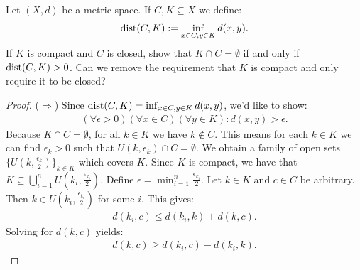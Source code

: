 \documentclass[11pt,twoside,openany]{memoir}
\begin{document}
    \begin{exercise}
        Let $(X,d)$ be a metric space. If $C,K \subseteq X$ we define:
            \begin{equation*}
            \begin{split}
                \operatorname{dist}(C,K):= \inf_{x \in C, y \in K}d(x,y).
            \end{split}
            \end{equation*}
        If $K$ is compact and $C$ is closed, show that $K \cap C = \emptyset$ if and only if $\operatorname{dist}(C,K) > 0$. Can we remove the requirement that $K$ is compact and only require it to be closed?
                \begin{proof}
                    ($\Rightarrow$) Since $\operatorname{dist}(C,K) = \inf_{x \in C,y \in K}d(x,y)$, we'd like to show:
                        \begin{equation*}
                        \begin{split}
                            (\forall \epsilon > 0)(\forall x \in C)(\forall y \in K): d(x,y) > \epsilon.
                        \end{split}
                        \end{equation*}
                    Because $K \cap C = \emptyset$, for all $k \in K$ we have $k \not\in C$. This means for each $k \in K$ we can find $\epsilon_k > 0$ such that $U(k,\epsilon_k) \cap C = \emptyset$. We obtain a family of open sets $\{U(k,\frac{\epsilon_k}{2})\}_{k \in K}$ which covers $K$. Since $K$ is compact, we have that $K \subseteq \bigcup_{i = 1}^n U(k_i,\frac{\epsilon_{k_i}}{2})$. Define $\epsilon = \min_{i = 1}^n \frac{\epsilon_{k_i}}{2}$. Let $k \in K$ and $c \in C$ be arbitrary. Then $k \in U(k_i,\frac{\epsilon_{k_i}}{2})$ for some $i$. This gives:
                        \begin{equation*}
                        \begin{split}
                            d(k_i,c) \leq d(k_i,k) + d(k,c).
                        \end{split}
                        \end{equation*}
                    Solving for $d(k,c)$ yields:
                        \begin{equation*}
                        \begin{split}
                            d(k,c) \geq d(k_i,c) -d(k_i,k).
                        \end{split}
                        \end{equation*}

\end{proof}
\end{exercise}
\end{document}
